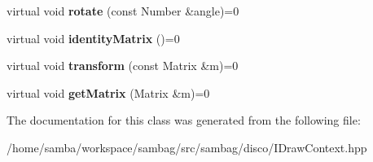 \begin{DoxyCompactItemize}
\item 
\hypertarget{classsambag_1_1disco_1_1_i_draw_context_aaa66abee764e1cf9a21ff99f4970242a}{
virtual void {\bfseries rotate} (const Number \&angle)=0}
\label{classsambag_1_1disco_1_1_i_draw_context_aaa66abee764e1cf9a21ff99f4970242a}

\item 
\hypertarget{classsambag_1_1disco_1_1_i_draw_context_af445ec1f242f091789865a59d7a36b11}{
virtual void {\bfseries identityMatrix} ()=0}
\label{classsambag_1_1disco_1_1_i_draw_context_af445ec1f242f091789865a59d7a36b11}

\item 
\hypertarget{classsambag_1_1disco_1_1_i_draw_context_acaee8e16ccdf7b29e287ba1e49391453}{
virtual void {\bfseries transform} (const Matrix \&m)=0}
\label{classsambag_1_1disco_1_1_i_draw_context_acaee8e16ccdf7b29e287ba1e49391453}

\item 
\hypertarget{classsambag_1_1disco_1_1_i_draw_context_a84c26f109b3ca41b6d5ae42ee6ea9427}{
virtual void {\bfseries getMatrix} (Matrix \&m)=0}
\label{classsambag_1_1disco_1_1_i_draw_context_a84c26f109b3ca41b6d5ae42ee6ea9427}

\end{DoxyCompactItemize}


The documentation for this class was generated from the following file:\begin{DoxyCompactItemize}
\item 
/home/samba/workspace/sambag/src/sambag/disco/IDrawContext.hpp\end{DoxyCompactItemize}
